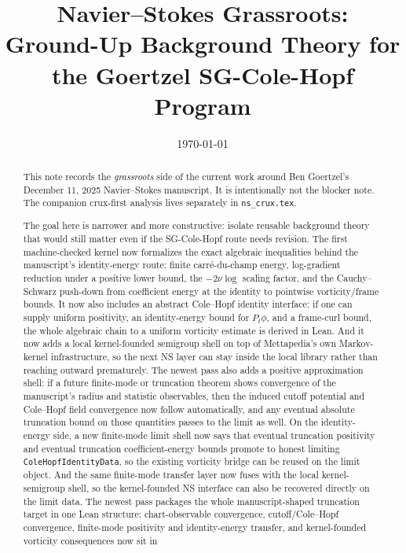\documentclass[11pt]{article}
\title{Navier--Stokes Grassroots:\\
Ground-Up Background Theory for the Goertzel SG-Cole-Hopf Program}
\author{}
\date{\today}
\theoremstyle{remark}
\begin{document}
\maketitle

\begin{abstract}
This note records the \emph{grassroots} side of the current work around Ben
Goertzel's December 11, 2025 Navier--Stokes manuscript.  It is intentionally
not the blocker note.  The companion crux-first analysis lives separately in
\texttt{ns\_crux.tex}.

The goal here is narrower and more constructive: isolate reusable background
theory that would still matter even if the SG-Cole-Hopf route needs revision.
The first machine-checked kernel now formalizes the exact algebraic inequalities
behind the manuscript's identity-energy route: finite carré-du-champ energy,
log-gradient reduction under a positive lower bound, the \(-2\nu \log\) scaling
factor, and the Cauchy--Schwarz push-down from coefficient energy at the
identity to pointwise vorticity/frame bounds.  It now also includes an abstract
Cole--Hopf identity interface: if one can supply uniform positivity, an
identity-energy bound for \(P_t\phi\), and a frame-curl bound, the whole
algebraic chain to a uniform vorticity estimate is derived in Lean.  And it now
adds a local kernel-founded semigroup shell on top of Mettapedia's own
Markov-kernel infrastructure, so the next NS layer can stay inside the local
library rather than reaching outward prematurely.  The newest pass also adds a
positive approximation shell: if a future finite-mode or truncation theorem
shows convergence of the manuscript's radius and statistic observables, then
the induced cutoff potential and Cole--Hopf field convergence now follow
automatically, and any eventual absolute truncation bound on those quantities
passes to the limit as well.  On the identity-energy side, a new finite-mode
limit shell now says that eventual truncation positivity and eventual
truncation coefficient-energy bounds promote to honest limiting
\texttt{ColeHopfIdentityData}, so the existing vorticity bridge can be reused on
the limit object.  And the same finite-mode transfer layer now fuses with the
local kernel-semigroup shell, so the kernel-founded NS interface can also be
recovered directly on the limit data.  The newest pass packages the whole
manuscript-shaped truncation target in one Lean structure: chart-observable
convergence, cutoff/Cole--Hopf convergence, finite-mode positivity and
identity-energy transfer, and kernel-founded vorticity consequences now sit in

\end{abstract}
\end{document}
